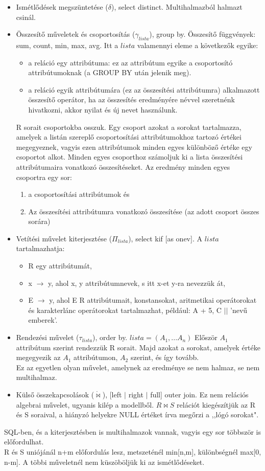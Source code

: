 \documentclass[margin=0px]{article}
\begin{document}
	\begin{itemize}
		\item Ismétlődések megszüntetése ($\delta$), select distinct. Multihalmazból halmazt csinál.
		\item Összesítő műveletek és csoportosítás ($\gamma_{lista}$), group by. Összesítő függvények: sum, count, min, max, avg. Itt a $lista$ valamennyi eleme a következők egyike:
		\begin{itemize}
			\item a reláció egy attribútuma: ez az attribútum egyike a csoportosító attribútumoknak (a GROUP BY után jelenik meg).
			\item a reláció egyik attribútumára (ez az összesítési attribútumra) alkalmazott összesítő operátor, ha az összesítés eredményére névvel szeretnénk hivatkozni, akkor nyilat és új nevet használunk.
		\end{itemize}
		R sorait csoportokba osszuk. Egy csoport azokat a sorokat tartalmazza, amelyek a listán szereplő
		csoportosítási attribútumokhoz tartozó értékei megegyeznek, vagyis ezen attribútumok minden egyes különböző értéke egy csoportot alkot. Minden egyes csoporthoz számoljuk ki a lista összesítési attribútumaira vonatkozó összesítéseket. Az eredmény minden egyes csoportra egy sor:
		\begin{enumerate}
			\item a csoportosítási attribútumok és
			\item Az összesítési attribútumra vonatkozó összesítése	(az adott csoport összes sorára)
		\end{enumerate} 
		\item Vetítési művelet kiterjesztése ($\Pi_{lista}$), select kif [as onev]. A $lista$ tartalmazhatja:
		\begin{itemize}
			\item R egy attribútumát,
			\item x $\to$ y, ahol x, y attribútumnevek, s itt x-et y-ra nevezzük át,
			\item E $\to$ y, ahol E R attribútumait, konstansokat, aritmetikai operátorokat és karakterlánc operátorokat tartalmazhat, például: A + 5, C $||$ 'nevű emberek'.
		\end{itemize}
		\item Rendezési művelet ($\tau_{lista}$), order by. $lista = (A_1,...A_n)$ Először $A_1$ attribútum szerint rendezzük R sorait. Majd azokat a sorokat, amelyek értéke megegyezik az $A_1$ attribútumon, $A_2$ szerint, és így tovább. \\
		Ez az egyetlen olyan művelet, amelynek az eredménye se nem halmaz, se nem multihalmaz.
		\item Külső összekapcsolások ($\mathring{\bowtie}$), [left $|$ right $|$ full] outer join. Ez nem relációs algebrai művelet, ugyanis kilép a modellből. $R \bowtie S$ relációt kiegészítjük az R és S soraival, a hiányzó helyekre NULL értéket írva megőrzi a ,,lógó sorokat".
	\end{itemize}
	SQL-ben, és a kiterjesztésben is multihalmazok vannak, vagyis egy sor többször is előfordulhat. \\
	R és S uniójánál n+m előfordulás lesz, metszeténél min[n,m], különbségnél max[0, n-m]. A többi műveletnél nem küszöböljük ki az ismétlődéseket.
	
\end{document}
